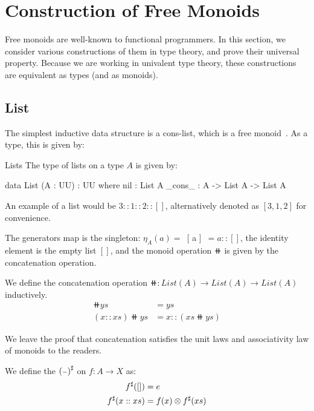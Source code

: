 \section{Construction of Free Monoids}
\label{sec:monoids}

Free monoids are well-known to functional programmers. In this section, we consider various constructions of them in type theory, and prove their universal property. Because we are working in univalent type theory, these constructions are equivalent as types (and as monoids).

\subsection{List}

The simplest inductive data structure is a cons-list, which is a free monoid~\cite{dubucFreeMonoids1974}. As a type, this is given by:

\begin{definition}{Lists}
The type of lists on a type $A$ is given by:
\begin{code}
data List (A : UU) : UU where
  nil : List A
  _cons_ : A -> List A -> List A
\end{code}
\end{definition}

An example of a list would be $3 :: 1 :: 2 :: []$, alternatively denoted as $[3, 1, 2]$ for convenience.

The generators map is the singleton: $\eta_A(a) =$~[ a ]~$= a :: []$, 
the identity element is the empty list $[]$,
and the monoid operation $\doubleplus$ is given by the concatenation operation.

\begin{definition}[Concatenation]
We define the concatenation operation $\doubleplus : List(A) \to List(A) \to List(A)$ inductively.
\begin{align*}
    [] \doubleplus ys & = ys \\
    (x :: xs) \doubleplus ys & = x :: (xs \doubleplus ys)
\end{align*}
\end{definition}

We leave the proof that concatenation satisfies the unit laws and associativity law of monoids to the readers.

\begin{definition}
We define the ${({\scriptstyle{-}})}^{\sharp}$ on $f : A \to X$ as:
\begin{align*}
    {f}^{\sharp}([]) & = e \\
    {f}^{\sharp}(x :: xs) & =  f(x) \otimes {f}^{\sharp}(xs)
\end{align*} 
\end{definition}

